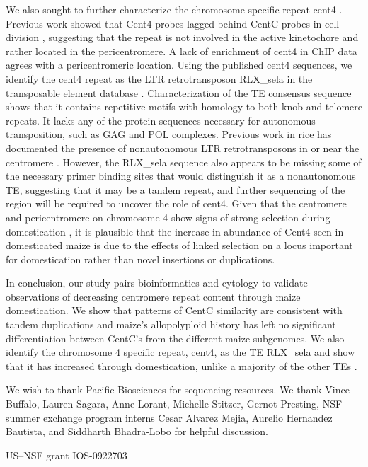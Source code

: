 We also sought to further characterize the chromosome specific repeat cent4 \citep{Page2001}.  Previous work showed that Cent4 probes lagged behind CentC probes in cell division \citep{Jiang2002}, suggesting that the repeat is not involved in the active kinetochore and rather located in the pericentromere.  A lack of enrichment of cent4 in ChIP data agrees with a pericentromeric location.  Using the published cent4 sequences, we identify the cent4 repeat as the LTR retrotransposon RLX\_sela in the transposable element database \citep{Baucom2009}.  Characterization of the TE consensus sequence shows that it contains repetitive motifs with homology to both knob and telomere repeats.  It lacks any of the protein sequences necessary for autonomous transposition, such as GAG and POL complexes.  Previous work in rice has documented the presence of nonautonomous LTR retrotransposons  in or near the centromere \citep{Jiang2002}.  However, the RLX\_sela sequence also appears to be missing some of the necessary primer binding sites that would distinguish it as a nonautonomous TE, suggesting that it may be a tandem repeat, and further sequencing of the region will be required to uncover the role of cent4.   Given that the centromere and pericentromere on chromosome 4 show signs of strong selection during domestication \citep{Hufford2012}, it is plausible that the increase in abundance of Cent4 seen in domesticated maize is due to the effects of linked selection on a locus important for domestication rather than novel insertions or duplications. 

In conclusion, our study pairs bioinformatics and cytology to validate observations of decreasing centromere repeat content through maize domestication.  We show that patterns of CentC similarity are consistent with tandem duplications and maize’s allopolyploid history has left no significant differentiation between CentC’s from the different maize subgenomes. We also identify the chromosome 4 specific repeat, cent4, as the TE RLX\_sela and show that it has increased through domestication, unlike a majority of the other TEs \citep{Chia2012}.    

\begin{acknowledgements}
We wish to thank Pacific Biosciences for sequencing resources.  We thank Vince Buffalo, Lauren Sagara, Anne Lorant, Michelle Stitzer, Gernot Presting,  NSF summer exchange program interns Cesar Alvarez Mejia, Aurelio Hernandez Bautista, and Siddharth Bhadra-Lobo for helpful discussion.


US–NSF grant IOS-0922703

\end{acknowledgements}

